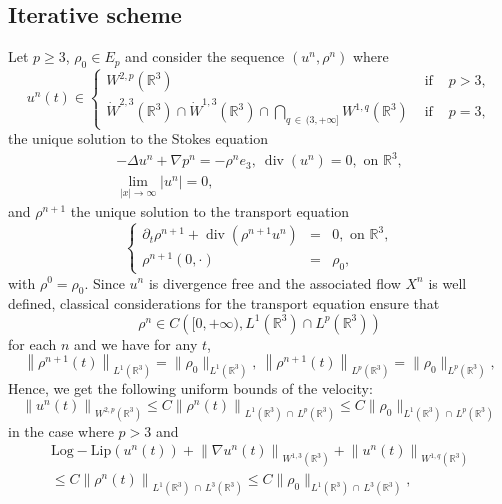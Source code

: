 \documentclass[AHL,Unicode,longabstracts,published]{cedram}
\newcommand{\LLip}{\mathrm{Log-Lip}}
\newcommand{\R}{\mathbb{R}}
\renewcommand{\leq}{\leqslant}
\renewcommand{\geq}{\geqslant}
\renewcommand{\div}{\operatorname{div}}
\begin{document}
\subsection{Iterative scheme} Let $p\geq 3$, $\rho_0 \in E_p$ and consider the sequence $(u^n,\rho^n)$ where
\[
u^n(t) \in
\left\{
\begin{array}{lcl}
W^{2,p}\left(\R^3\right) & \text{ if } & p>3,\\
\dot{W}^{2,3}\left(\R^3\right)\cap \dot{W}^{1,3}\left(\R^3\right) \cap \underset{q\,\in\,(3,+\infty]}{\bigcap} W^{1,q}\left(\R^3\right) & \text{ if } & p=3,
\end{array}
\right.
\]
the unique solution to the Stokes equation
\begin{equation*}
\begin{array}{c}
-\Delta u^n+ \nabla p^n= - \rho^n e_3, \:\div(u^n)=0, \text{ on } \R^3,\\
\underset{|x|\to \infty}{\lim} |u^n| = 0,
\end{array}
\end{equation*}
and $\rho^{n+1}$ the unique solution to the transport equation
\begin{equation*}
\left\{
\begin{array}{rcl}
\partial_t \rho^{n+1}+\div\left(\rho^{n+1} u^n\right)&=& 0, \text{ on } \R^3,\\
\rho^{n+1}(0,\cdot)&=& \rho_0,
\end{array}\right.
\end{equation*}
with $\rho^0=\rho_0$. Since $u^n$ is divergence free and the associated flow $X^n$ is well defined, classical considerations for the transport equation ensure that
\[
\rho^n \in C\left([0,+\infty), L^1\left(\R^3\right)\cap L^p\left(\R^3\right)\right)
\]
for each $n$ and we have for any $t$,
\begin{equation}\label{borne_rho_n}
\left\|\rho^{n+1}(t)\right\|_{L^1\left(\R^3\right)}=\|\rho_0\|_{L^1\left(\R^3\right)}, \: \left\|\rho^{n+1}(t)\right\|_{L^p\left(\R^3\right)}=\|\rho_0\|_{L^p\left(\R^3\right)},
\end{equation}
Hence, we get the following uniform bounds of the velocity:
\begin{equation}\label{borne_u^n}
\left\|u^n(t)\right\|_{W^{2,p}\left(\R^3\right)}\leq C \left\|\rho^n(t)\right\|_{L^1\left(\R^3\right)\,\cap \,L^p\left(\R^3\right)} \leq C \| \rho_0\|_{L^1\left(\R^3\right)\,\cap \,L^p\left(\R^3\right)}
\end{equation}
in the case where $p>3$ and
\begin{multline}\label{borne_u^n_bis}
\LLip(u^n(t))+ \left\|\nabla u^n(t)\right\|_{W^{1,3}\left(\R^3\right)}+ \left\| u^n(t)\right\|_{W^{1,q}\left(\R^3\right)}\\
\leq C \left\|\rho^n(t)\right\|_{L^1\left(\R^3\right)\,\cap\,L^3\left(\R^3\right)} \leq C \| \rho_0\|_{L^1\left(\R^3\right)\,\cap \,L^3\left(\R^3\right)},
\end{multline}
\end{document}
